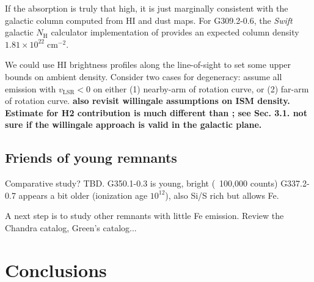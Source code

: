 \documentclass[preprint2,tighten,trackchanges]{aastex6}
\newcommand*{\mt}{\mathrm}
\newcommand*{\unit}[1]{\;\mt{#1}}  %
\newcommand*{\abt}{\mathord{\sim}} %
\newcommand*{\nH}{N_{\mathrm{H}}}
\newcommand*{\nHUnits}{\times 10^{22} \unit{cm^{-2}}}
\newcommand*{\AV}{A_{\mathrm{V}}}
\begin{document}

If the absorption is truly that high, it is just marginally consistent with
the galactic column computed from HI and dust maps.
For G309.2-0.6, the \textit{Swift} galactic $\nH$ calculator implementation of
\citet{willingale2013} provides an expected column density $1.81 \nHUnits$.

We could use HI brightness profiles along the line-of-sight to set some upper
bounds on ambient density.
Consider two cases for degeneracy: assume all emission with $v_{\mt{LSR}} < 0$
on either (1) nearby-arm of rotation curve, or (2) far-arm of rotation curve.
\textbf{also revisit willingale assumptions on ISM density.  Estimate for H2
contribution is much different than \citet{yamaguchi2012}; see Sec. 3.1.
not sure if the willingale approach is valid in the galactic plane.}





\subsection{Friends of young remnants}

Comparative study?  TBD.
G350.1-0.3 is young, bright (~100,000 counts)
G337.2-0.7 appears a bit older (ionization age $10^12$), also Si/S rich but
allows Fe.

A next step is to study other remnants with little Fe emission.
Review the Chandra catalog, Green's catalog...


\section{Conclusions}
\end{document}
